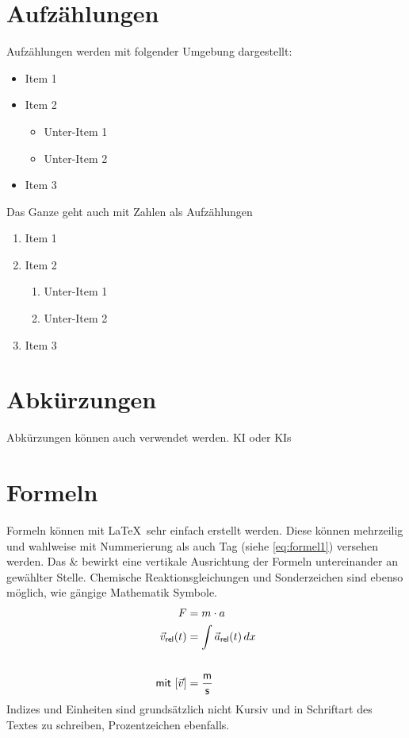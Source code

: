 \section{Aufzählungen}
Aufzählungen werden mit folgender Umgebung dargestellt:
\begin{itemize}
    \item Item 1
    \item Item 2
    \begin{itemize}
        \item Unter-Item 1
        \item Unter-Item 2
    \end{itemize}
    \item Item 3
\end{itemize}
Das Ganze geht auch mit Zahlen als Aufzählungen
\begin{enumerate}
    \item Item 1
    \item Item 2
    \begin{enumerate}
        \item Unter-Item 1
        \item Unter-Item 2
    \end{enumerate}
    \item Item 3
\end{enumerate}

\section{Abkürzungen}
Abkürzungen können auch verwendet werden. \acs{KI} oder \acfp{KI}

\section{Formeln}

Formeln können mit \LaTeX~sehr einfach erstellt werden. Diese können mehrzeilig und wahlweise mit Nummerierung als auch Tag (siehe \autoref{eq:formel1}) versehen werden. Das \glqq{}\&\grqq{} bewirkt eine vertikale Ausrichtung der Formeln untereinander an gewählter Stelle. Chemische Reaktionsgleichungen und Sonderzeichen sind ebenso möglich, wie gängige Mathematik Symbole.
\begin{align}
    F&=m \cdot a \notag \\
    \vec{v}_\mathsf{rel}(t)&=\int \vec{a}_\mathsf{rel}(t) \,dx \label{eq:formel1} \\[18pt]
    \mathsf{mit}~[\vec{v}]&=\mathsf{\frac{m}{s}} \notag
\end{align}
Indizes und Einheiten sind grundsätzlich nicht Kursiv und in Schriftart des Textes zu schreiben, Prozentzeichen ebenfalls.